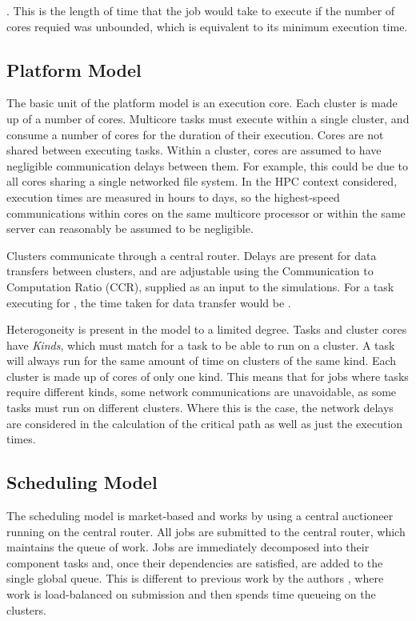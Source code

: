 \documentclass[english,british]{IEEEtran}
\begin{document}
\cite{Topcuoglu2002}. This is the length of time that the job would
take to execute if the number of cores requied was unbounded, which
is equivalent to its minimum execution time. 


\subsection{Platform Model}

The basic unit of the platform model is an execution core. Each cluster
is made up of a number of cores. Multicore tasks must execute within
a single cluster, and consume a number of cores for the duration of
their execution. Cores are not shared between executing tasks. Within
a cluster, cores are assumed to have negligible communication delays
between them. For example, this could be due to all cores sharing
a single networked file system. In the HPC context considered, execution
times are measured in hours to days, so the highest-speed communications
within cores on the same multicore processor or within the same server
can reasonably be assumed to be negligible.

Clusters communicate through a central router. Delays are present
for data transfers between clusters, and are adjustable using the
Communication to Computation Ratio (CCR), supplied as an input to
the simulations. For a task executing for ,
the time taken for data transfer would be .

Heterogoneity is present in the model to a limited degree. Tasks and
cluster cores have \emph{Kinds}, which must match for a task to be
able to run on a cluster. A task will always run for the same amount
of time on clusters of the same kind. Each cluster is made up of cores
of only one kind. This means that for jobs where tasks require different
kinds, some network communications are unavoidable, as some tasks
must run on different clusters. Where this is the case, the network
delays are considered in the calculation of the critical path as well
as just the execution times.


\subsection{Scheduling Model}

The scheduling model is market-based and works by using a central
auctioneer running on the central router. All jobs are submitted to
the central router, which maintains the queue of work. Jobs are immediately
decomposed into their component tasks and, once their dependencies
are satisfied, are added to the single global queue. This is different
to previous work by the authors \cite{aburkimsherEngD14}, where work
is load-balanced on submission and then spends time queueing on the
clusters.
\end{document}
